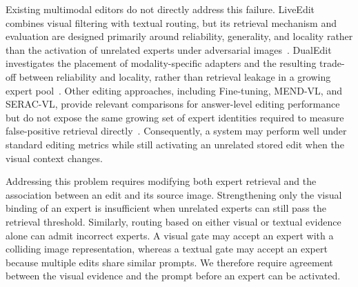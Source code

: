 \documentclass[letterpaper]{article} %
\begin{document}
Existing multimodal editors do not directly address this failure. LiveEdit combines visual filtering with textual routing, but its retrieval mechanism and evaluation are designed primarily around reliability, generality, and locality rather than the activation of unrelated experts under adversarial images~\citep{chen2025liveedit}. DualEdit investigates the placement of modality-specific adapters and the resulting trade-off between reliability and locality, rather than retrieval leakage in a growing expert pool~\citep{shi2025dualedit}. Other editing approaches, including Fine-tuning, MEND-VL, and SERAC-VL, provide relevant comparisons for answer-level editing performance but do not expose the same growing set of expert identities required to measure false-positive retrieval directly~\citep{Mitchell2021FastME,mitchell2022serac,cheng2023mmedit}. Consequently, a system may perform well under standard editing metrics while still activating an unrelated stored edit when the visual context changes.


Addressing this problem requires modifying both expert retrieval and the association between an edit and its source image. Strengthening only the visual binding of an expert is insufficient when unrelated experts can still pass the retrieval threshold. Similarly, routing based on either visual or textual evidence alone can admit incorrect experts. A visual gate may accept an expert with a colliding image representation, whereas a textual gate may accept an expert because multiple edits share similar prompts. We therefore require agreement between the visual evidence and the prompt before an expert can be activated.
\end{document}
